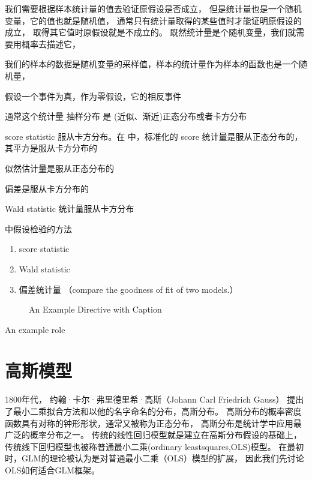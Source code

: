 \documentclass[letterpaper,10pt,english]{sphinxmanual}
\begin{document}
我们需要根据样本统计量的值去验证原假设是否成立，
但是统计量也是一个随机变量，它的值也就是随机值，
通常只有统计量取得的某些值时才能证明原假设的成立，
取得其它值时原假设就是不成立的。
既然统计量是个随机变量，我们就需要用概率去描述它，

我们的样本的数据是随机变量的采样值，样本的统计量作为样本的函数也是一个随机量，

假设一个事件为真，作为零假设，它的相反事件

通常这个统计量 抽样分布 是 (近似、渐近)正态分布或者卡方分布

score statistic 服从卡方分布。在  中，标准化的 score 统计量是服从正态分布的，其平方是服从卡方分布的

似然估计量是服从正态分布的

偏差是服从卡方分布的

Wald statistic 统计量服从卡方分布

 中假设检验的方法
\begin{enumerate}
%
\item {} 
score statistic

\item {} 
Wald statistic

\item {} 
偏差统计量 （compare the goodness of fit of two models.）

\end{enumerate}
\begin{figure}[htp]\centering\capstart{}\caption{An Example Directive with Caption}\label{\detokenize{_u6a21_u578b_u8bc4_u4f30/influence:id17}}\end{figure}
An example role 


\chapter{高斯模型}
\label{\detokenize{_u9ad8_u65af_u6a21_u578b/content:id1}}\label{\detokenize{_u9ad8_u65af_u6a21_u578b/content::doc}}
1800年代，
约翰·卡尔·弗里德里希·高斯（Johann Carl Friedrich Gauss）
提出了最小二乘拟合方法和以他的名字命名的分布，高斯分布。
高斯分布的概率密度函数具有对称的钟形形状，通常又被称为正态分布，
高斯分布是统计学中应用最广泛的概率分布之一。
传统的线性回归模型就是建立在高斯分布假设的基础上，
传统线下回归模型也被称普通最小二乘(ordinary least\sphinxhyphen{}squares,OLS)模型。
在最初时，GLM的理论被认为是对普通最小二乘（OLS）模型的扩展，
因此我们先讨论OLS如何适合GLM框架。
\end{document}
